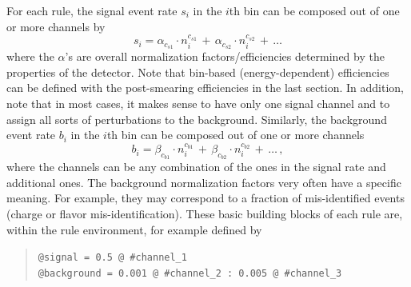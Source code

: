 For each rule, the signal event rate $s_i$ in the $i$th bin can be composed 
out of one or more channels by 
\begin{equation}
s_i=\alpha_{c_{s1}}\cdot n_i^{c_{s1}}\,+\,\alpha_{c_{s2}}\cdot n_i^{c_{s2}}\,+\,\ldots
\end{equation}
where the $\alpha$'s are overall normalization factors/efficiencies
 determined by the properties of the detector. Note that bin-based (energy-dependent) efficiencies can be defined with the post-smearing efficiencies in the last section. 
In addition, note that in most cases, it makes sense to have only one 
signal channel and to assign all sorts of perturbations to the background. 
%
Similarly, the background event rate $b_i$ in the $i$th bin can be composed
out of one or more channels
\begin{equation}
b_i=\beta_{c_{b1}}\cdot n_i^{c_{b1}}\,+\,\beta_{c_{b2}}\cdot n_i^{c_{b2}}\,+\,\ldots \, ,
\end{equation}
where the channels can be any combination of the ones in the signal rate and 
additional ones. The background normalization factors very often have
a specific meaning. For example, they may correspond to a fraction
of mis-identified events (charge or flavor mis-identification).
%
These basic building blocks of each rule are, within the rule environment,
for example defined by
\begin{quote}
{\tt \tb @signal = 0.5 @ \#channel\_1\\
\tb @background = 0.001 @ \#channel\_2 :  0.005 @ \#channel\_3
}
\end{quote}

